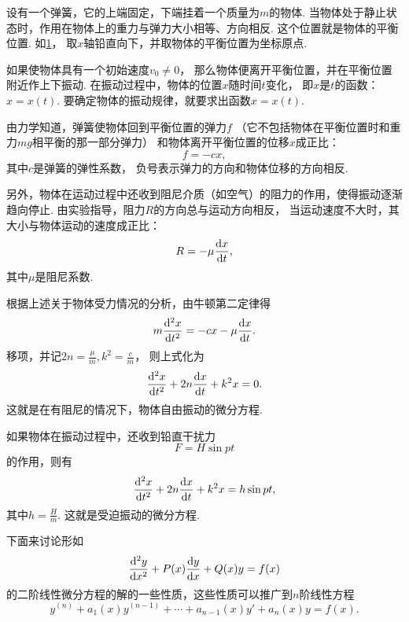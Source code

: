 \begin{figure}[ht]
	\centering
	\caption{}
	\label{figure:微分方程.重力场中的弹簧振子模型}
\end{figure}
\begin{example}
设有一个弹簧，它的上端固定，下端挂着一个质量为\(m\)的物体.
当物体处于静止状态时，作用在物体上的重力与弹力大小相等、方向相反.
这个位置就是物体的平衡位置.
如\cref{figure:微分方程.重力场中的弹簧振子模型}，
取\(x\)轴铅直向下，并取物体的平衡位置为坐标原点.

如果使物体具有一个初始速度\(v_0\neq0\)，
那么物体便离开平衡位置，并在平衡位置附近作上下振动.
在振动过程中，物体的位置\(x\)随时间\(t\)变化，
即\(x\)是\(t\)的函数：\(x=x(t)\).
要确定物体的振动规律，就要求出函数\(x=x(t)\).

由力学知道，弹簧使物体回到平衡位置的弹力\(f\)
（它不包括物体在平衡位置时和重力\(mg\)相平衡的那一部分弹力）
和物体离开平衡位置的位移\(x\)成正比：\[
	f = -cx,
\]
其中\(c\)是弹簧的弹性系数，
负号表示弹力的方向和物体位移的方向相反.

另外，物体在运动过程中还收到阻尼介质（如空气）的阻力的作用，使得振动逐渐趋向停止.
由实验指导，阻力\(R\)的方向总与运动方向相反，
当运动速度不大时，其大小与物体运动的速度成正比：\[
	R = -\mu \dv{x}{t},
\]
其中\(\mu\)是阻尼系数.

根据上述关于物体受力情况的分析，由牛顿第二定律得\[
	m \dv[2]{x}{t} = -cx -\mu \dv{x}{t}.
\]
移项，并记\(2n=\frac{\mu}{m},
k^2=\frac{c}{m}\)，
则上式化为\[
	\dv[2]{x}{t}+2n\dv{x}{t}+k^2x=0.
\]
这就是在有阻尼的情况下，物体自由振动的微分方程.

如果物体在振动过程中，还收到铅直干扰力\[
	F = H \sin pt
\]的作用，则有\[
	\dv[2]{x}{t} + 2n \dv{x}{t} + k^2x = h \sin pt,
\]
其中\(h=\frac{H}{m}\).
这就是受迫振动的微分方程.
\end{example}

下面来讨论形如
\begin{equation}\label{equation:微分方程.二阶非齐次线性微分方程的一般形式}
\dv[2]{y}{x} + P(x) \dv{y}{x} + Q(x) y = f(x)
\end{equation}
的二阶线性微分方程的解的一些性质，这些性质可以推广到\(n\)阶线性方程
\begin{equation}\label{equation:微分方程.n阶线性微分方程的一般形式}
y^{(n)} + a_1(x) y^{(n-1)} + \dotsb + a_{n-1}(x) y' + a_n(x) y = f(x).
\end{equation}

